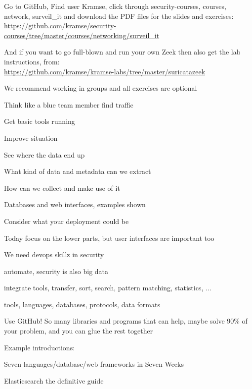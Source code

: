 \documentclass[Screen16to9,17pt]{foils}
\begin{document}

\begin{list2}
\item Go to GitHub, Find user Kramse, click through security-courses, courses, network, surveil\_it and download the PDF files for the slides and exercises:\\  {\footnotesize \url{https://github.com/kramse/security-courses/tree/master/courses/networking/surveil_it}}

\item And if you want to go full-blown and run your own Zeek then also get the lab instructions, from:\\ {\footnotesize\url{https://github.com/kramse/kramse-labs/tree/master/suricatazeek}}
\end{list2}

We recommend working in groups and all exercises are optional {\Huge\smiley}


\begin{list1}
\item Think like a blue team member find traffic
\item Get basic tools running
\item Improve situation
\begin{list2}
\item See where the data end up
\item What kind of data and metadata can we extract
\item How can we collect and make use of it
\item Databases and web interfaces, examples shown
\item Consider what your deployment could be
\end{list2}
\end{list1}

\centerline{Today focus on the lower parts, but user interfaces are important too}


\begin{list1}
\item We need devops skillz in security
\item automate, security is also big data
\item integrate tools, transfer, sort, search, pattern matching, statistics, ...
\item tools, languages, databases, protocols, data formats
\item Use GitHub! So many libraries and programs that can help, maybe solve  90\% of your problem, and you can glue the rest together
\item Example introductions:
\begin{list2}
\item Seven languages/database/web frameworks in Seven Weeks
\item Elasticsearch the definitive guide
\end{list2}
\end{list1}
\end{document}
